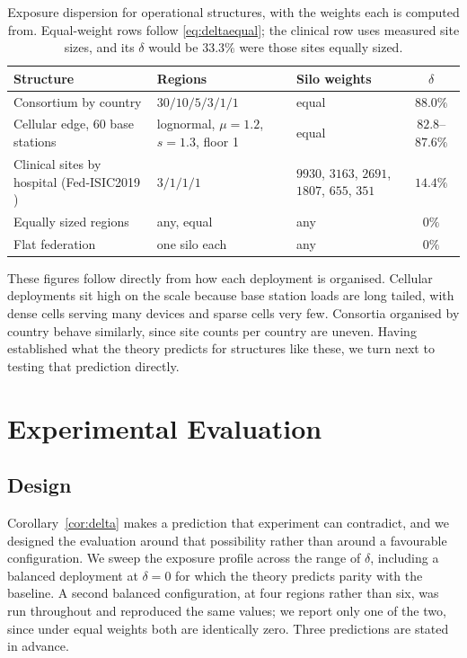 \documentclass[acmsmall,screen,review,anonymous]{acmart}
\theoremstyle{acmdefinition}%
\begin{document}
\begin{table}[t]
\caption{Exposure dispersion for operational structures, with the weights each is computed from. Equal-weight rows follow \eqref{eq:deltaequal}; the clinical row uses measured site sizes, and its $\delta$ would be $33.3\%$ were those sites equally sized.}
\label{tab:realdelta}
\centering
\footnotesize
\setlength{\tabcolsep}{4pt}
\begin{tabular}{@{}p{}p{}p{}c@{}}
\toprule
Structure & Regions & Silo weights & $\delta$ \\
\midrule
Consortium by country & $30/10/5/3/1/1$ & equal & $88.0\%$ \\
Cellular edge, 60 base stations \cite{wang2017cellular} & lognormal, $\mu{=}1.2$, $s{=}1.3$, floor 1 & equal & $82.8$--$87.6\%$ \\
Clinical sites by hospital (Fed-ISIC2019 \cite{terrail2022flamby}) & $3/1/1/1$ & $9930$, $3163$, $2691$, $1807$, $655$, $351$ & $14.4\%$ \\
Equally sized regions & any, equal & any & $0\%$ \\
Flat federation & one silo each & any & $0\%$ \\
\bottomrule
\end{tabular}
\end{table}

These figures follow directly from how each deployment is organised. Cellular
deployments sit high on the scale because base station loads are long tailed, with
dense cells serving many devices and sparse cells very few. Consortia organised by
country behave similarly, since site counts per country are uneven. Having
established what the theory predicts for structures like these, we turn next to
testing that prediction directly.

\section{Experimental Evaluation}
\label{sec:eval}

\subsection{Design}

Corollary~\ref{cor:delta} makes a prediction that experiment can contradict, and
we designed the evaluation around that possibility rather than around a favourable
configuration. We sweep the exposure profile across the range of $\delta$,
including a balanced deployment at $\delta = 0$ for which the theory predicts
parity with the baseline. A second balanced configuration, at four regions rather
than six, was run throughout and reproduced the same values; we report only one of
the two, since under equal weights both are identically zero. Three predictions
are stated in advance.
\end{document}
